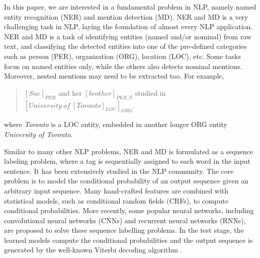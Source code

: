 \documentclass[11pt,a4paper]{article}
\begin{document}
In this paper, we are interested in a fundamental problem in NLP, namely named entity recognition (NER) and mention detection (MD). NER and MD is a very challenging task in NLP, laying the foundation of almost every NLP application.
NER and MD is a task of identifying entities (named and/or nominal) from raw text, and classifying the detected entities into one of the pre-defined categories such as person (PER), organization (ORG), location (LOC), etc. Some tasks focus on named entities only, 
while the others also detects nominal mentions. %
Moreover, nested mentions may need to be extracted too. For example, 
\begin{quote}
	\small
	$[Sue]_{PER}$ and her $[brother]_{PER\_N}$ studied in ${[University\ of\ {[Toronto]}_{LOC}]}_{ORG}$. 
\end{quote}
where {\it Toronto} is a LOC entity, embedded in another longer ORG entity {\it University of Toronto}.

Similar to many other NLP problems, NER and MD is formulated as a sequence labeling problem, where a tag is sequentially assigned to each word in the input sentence. It has been extensively studied in the NLP community. The core problem is to model the conditional probability of an output sequence given an arbitrary input sequence. Many hand-crafted features are combined with statistical models, such as conditional random fields (CRFs), to compute conditional probabilities. More recently, some popular neural networks, including convolutional neural networks (CNNs) and recurrent neural networks (RNNs), are proposed to solve these sequence labelling problems.
In the test stage, the learned models compute the conditional probabilities and the output sequence is generated by the well-known Viterbi decoding algorithm \cite{Viterbi1967err}. 
\end{document}
